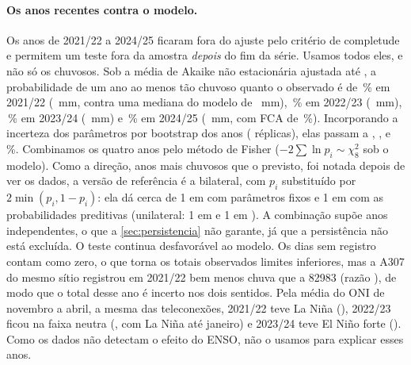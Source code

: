 \documentclass[11pt,a4paper]{article}
\newcommand{\Est}{82983}
\begin{document}
\paragraph{Os anos recentes contra o modelo.} Os anos de 2021/22 a 2024/25 ficaram fora do ajuste
pelo critério de completude e permitem um teste fora da amostra \emph{depois} do fim da série. Usamos
todos eles, e não só os chuvosos. Sob a média de Akaike não estacionária ajustada até \UltimoAnoNS{}, a
probabilidade de um ano ao menos tão chuvoso quanto o observado é de \PRecVinteUm{}\,\% em 2021/22
(\ChuvaObsVinteUm{}~mm, contra uma mediana do modelo de \MedianaModeloVinteUm{}~mm), \PRecVinteDois{}\,\%
em 2022/23 (\ChuvaObsVinteDois{}~mm), \PRecVinteTres{}\,\% em 2023/24 (\ChuvaObsVinteTres{}~mm) e
\PRecVinteQuatro{}\,\% em 2024/25 (\ChuvaObsRecVinteQuatro{}~mm, com FCA de \FCARecVinteQuatro{}\,\%).
Incorporando a incerteza dos parâmetros por bootstrap dos anos (\NBootRec{} réplicas), elas passam a
\PRecPredVinteUm{}, \PRecPredVinteDois{}, \PRecPredVinteTres{} e \PRecPredVinteQuatro{}\,\%. Combinamos os
quatro anos pelo método de Fisher ($-2\sum \ln p_i \sim \chi^2_8$ sob o modelo). Como a direção, anos
mais chuvosos que o previsto, foi notada depois de ver os dados, a versão de referência é a bilateral,
com $p_i$ substituído por $2\min(p_i, 1-p_i)$: ela dá cerca de 1 em \PRecFisherBilInv{} com parâmetros
fixos e 1 em \PRecFisherBilPredInv{} com as probabilidades preditivas (unilateral: 1 em \PRecFisherInv{}
e 1 em \PRecFisherPredInv{}). A combinação supõe anos independentes, o que a \cref{sec:persistencia} não
garante, já que a persistência não está excluída. O teste continua desfavorável ao modelo. Os dias sem
registro contam como zero, o que torna os totais observados limites inferiores, mas a A307 do mesmo
sítio registrou em 2021/22 bem menos chuva que a \Est{} (razão \RazaoChuvaVinteUm), de modo que o total
desse ano é incerto nos dois sentidos. Pela média do ONI de novembro a abril, a mesma das
teleconexões, 2021/22 teve La Niña (\ONIRecVinteUm{}), 2022/23 ficou na faixa neutra
(\ONIRecVinteDois{}, com La Niña até janeiro) e 2023/24 teve El Niño forte (\ONIRecVinteTres{}). Como os
dados não detectam o efeito do ENSO, não o usamos para explicar esses anos.
\end{document}
